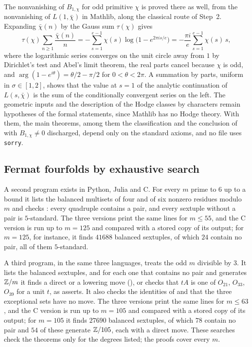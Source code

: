 The nonvanishing of $B_{1,\chi}$ for odd primitive $\chi$ is proved there as
well, from the nonvanishing of $L(1,\bar\chi)$ in Mathlib, along the classical
route of Step~2. Expanding $\bar\chi(n)$ by the Gauss sum $\tau(\chi)$ gives
\[
  \tau(\chi)\sum_{n\ge1}\frac{\bar\chi(n)}{n}
  =-\sum_{s=1}^{e-1}\chi(s)\log\bigl(1-e^{2\pi is/e}\bigr)
  =-\frac{\pi i}{e}\sum_{s=1}^{e-1}\chi(s)\,s,
\]
where the logarithmic series converges on the unit circle away from $1$ by
Dirichlet's test and Abel's limit theorem, the real parts cancel because
$\chi$ is odd, and $\arg(1-e^{i\theta})=\theta/2-\pi/2$ for
$0<\theta<2\pi$. A summation by parts, uniform in $\sigma\in[1,2]$, shows that
the value at $s=1$ of the analytic continuation of $L(s,\bar\chi)$ is the sum
of the conditionally convergent series on the left. The geometric inputs and
the description of the Hodge classes by characters remain hypotheses of the
formal statements, since Mathlib has no Hodge theory. With them, the main
theorems, among them the classification and the conclusion of 
with $B_{1,\chi}\ne0$ discharged, depend only on the standard axioms, and no
file uses \texttt{sorry}.

\subsection*{Fermat fourfolds by exhaustive search}
A second program exists in Python, Julia and C. For
every $m$ prime to $6$ up to a bound it lists the balanced multisets of four
and of six nonzero residues modulo $m$ and checks : every
quadruple contains a pair, and every sextuple without a pair is $5$-standard.
The three versions print the same lines for $m\le55$, and the C version is run
up to $m=125$ and compared with a stored copy of its output; for $m=125$, for
instance, it finds $41688$ balanced sextuples, of which $24$ contain no pair,
all of them $5$-standard.

A third program, in the same three languages, treats the odd
$m$ divisible by $3$. It lists the balanced sextuples, and for each one that
contains no pair and generates $\mathbb{Z}/m$ it finds a direct or a lowering move
(), or checks that $tA$ is one of $O_{21}$, $O_{33}$, $O_{39}$
for a unit $t$, as  asserts. It also checks the identities of
 and that the three exceptional sets have no move. The
three versions print the same lines for $m\le63$, and the C version is run up
to $m=105$ and compared with a stored copy of its output; for $m=105$ it
finds $27690$ balanced sextuples, of which $78$ contain no pair and $54$ of
these generate $\mathbb{Z}/105$, each with a direct move. These searches check the
theorems only for the degrees listed; the proofs cover every $m$.

